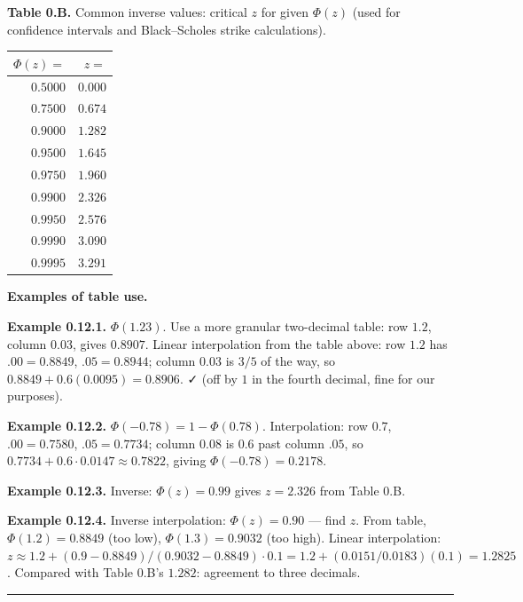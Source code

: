 \documentclass[
  10pt,
  twoside]{book}
\newcounter{none} %
\begin{document}
\textbf{Table 0.B.} Common inverse values: critical \(z\) for given
\(\Phi(z)\) (used for confidence intervals and Black--Scholes strike
calculations).

{\def\LTcaptype{none} %
\begin{table}[H]
\centering
\begin{tabular}{|r|r|}
\toprule
\(\Phi(z) =\) & \(z =\) \\
\midrule



\(0.5000\) & \(0.000\) \\
\(0.7500\) & \(0.674\) \\
\(0.9000\) & \(1.282\) \\
\(0.9500\) & \(1.645\) \\
\(0.9750\) & \(1.960\) \\
\(0.9900\) & \(2.326\) \\
\(0.9950\) & \(2.576\) \\
\(0.9990\) & \(3.090\) \\
\(0.9995\) & \(3.291\) \\
\bottomrule
\end{tabular}
\end{table}
}

\textbf{Examples of table use.}

\textbf{Example 0.12.1.} \(\Phi(1.23)\). Use a more granular two-decimal
table: row \(1.2\), column \(0.03\), gives \(0.8907\). Linear
interpolation from the table above: row \(1.2\) has \(.00 = 0.8849\),
\(.05 = 0.8944\); column \(0.03\) is \(3/5\) of the way, so
\(0.8849 + 0.6(0.0095) = 0.8906\). ✓ (off by \(1\) in the fourth
decimal, fine for our purposes).

\textbf{Example 0.12.2.} \(\Phi(-0.78) = 1 - \Phi(0.78)\).
Interpolation: row \(0.7\), \(.00 = 0.7580\), \(.05 = 0.7734\); column
\(0.08\) is \(0.6\) past column \(.05\), so
\(0.7734 + 0.6 \cdot 0.0147 \approx 0.7822\), giving
\(\Phi(-0.78) = 0.2178\).

\textbf{Example 0.12.3.} Inverse: \(\Phi(z) = 0.99\) gives \(z = 2.326\)
from Table 0.B.

\textbf{Example 0.12.4.} Inverse interpolation: \(\Phi(z) = 0.90\) ---
find \(z\). From table, \(\Phi(1.2) = 0.8849\) (too low),
\(\Phi(1.3) = 0.9032\) (too high). Linear interpolation:
\(z \approx 1.2 + (0.9 - 0.8849)/(0.9032 - 0.8849) \cdot 0.1 = 1.2 + (0.0151/0.0183)(0.1) = 1.2825\).
Compared with Table 0.B's \(1.282\): agreement to three decimals.

\begin{center}\rule{0.5\linewidth}{0.5pt}\end{center}
\end{document}
